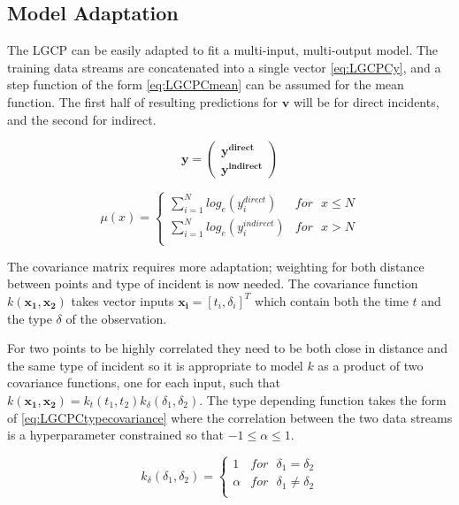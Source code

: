 \documentclass[a4paper,11pt]{report}
\begin{document}
\subsection{Model Adaptation}

The LGCP can be easily adapted to fit a multi-input, multi-output model. The training data streams are concatenated into a single vector \ref{eq:LGCPCy}, and a step function of the form \ref{eq:LGCPCmean} can be assumed for the mean function. The first half of resulting predictions for \(\mathbf{v}\) will be for direct incidents, and the second for indirect.

\begin{equation} \label{eq:LGCPCy}
\mathbf{y} = \left( \begin{array}{cc}
\mathbf{y^{direct}} \\
\mathbf{y^{indirect}} \end{array} \right)
\end{equation}

\begin{equation} \label{eq:LGCPCmean}
\mu (x) = \begin{cases}  
\displaystyle \sum_{i=1}^{N} log_e(y_i^{direct}) & for \text{ }x\le N \\
\displaystyle \sum_{i=1}^{N}log_e(y_i^{indirect}) & for \text{ }x>N \\ \end{cases}
\end{equation}

The covariance matrix requires more adaptation; weighting for both distance between points and type of incident is now needed. The covariance function \(k(\mathbf{x_1}, \mathbf{x_2})\) takes vector inputs \(\mathbf{x_i} = [t_i,\delta_i]^T\) which contain both the time \(t\) and the type \(\delta\) of the observation. \par

For two points to be highly correlated they need to be both close in distance and the same type of incident so it is appropriate to model \(k\) as a product of two covariance functions, one for each input, such that \(k(\mathbf{x_1}, \mathbf{x_2}) = k_t(t_1,t_2) k_{\delta}(\delta_1,\delta_2)\). The type depending function takes the form of \ref{eq:LGCPCtypecovariance} where the correlation between the two data streams is a hyperparameter constrained so that \(-1\le \alpha \le 1\).

\begin{equation} \label{eq:LGCPCtypecovariance}
k_{\delta}(\delta_1,\delta_2) = \begin{cases}
1 & for \text{ } \delta_1 = \delta_2 \\
\alpha & for \text{ } \delta_1 \neq \delta_2 \\ \end{cases}
\end{equation}
\end{document}
